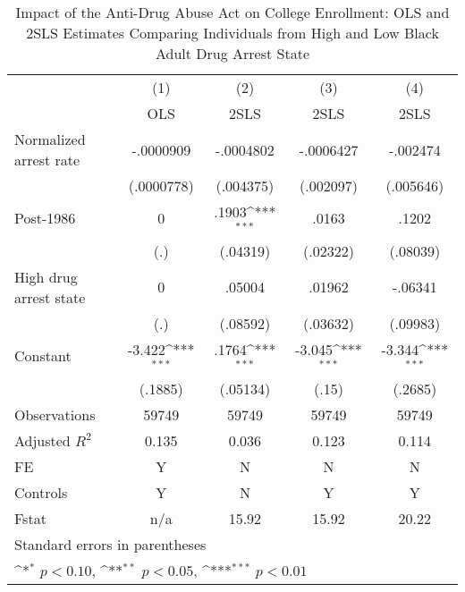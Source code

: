 \begin{table}[htbp]\centering
\def\sym#1{\ifmmode^{#1}\else\(^{#1}\)\fi}
\caption{Impact of the Anti-Drug Abuse Act on College Enrollment: OLS and 2SLS Estimates Comparing Individuals from High and Low Black Adult Drug Arrest State}
\begin{tabular}{l*{4}{c}}
\hline\hline
                    &\multicolumn{1}{c}{(1)}&\multicolumn{1}{c}{(2)}&\multicolumn{1}{c}{(3)}&\multicolumn{1}{c}{(4)}\\
                    &\multicolumn{1}{c}{OLS}&\multicolumn{1}{c}{2SLS}&\multicolumn{1}{c}{2SLS}&\multicolumn{1}{c}{2SLS}\\
\hline
Normalized arrest rate&   -.0000909         &   -.0004802         &   -.0006427         &    -.002474         \\
                    &  (.0000778)         &   (.004375)         &   (.002097)         &   (.005646)         \\
[1em]
Post-1986           &           0         &       .1903\sym{***}&       .0163         &       .1202         \\
                    &         (.)         &    (.04319)         &    (.02322)         &    (.08039)         \\
[1em]
High drug arrest state&           0         &      .05004         &      .01962         &     -.06341         \\
                    &         (.)         &    (.08592)         &    (.03632)         &    (.09983)         \\
[1em]
Constant            &      -3.422\sym{***}&       .1764\sym{***}&      -3.045\sym{***}&      -3.344\sym{***}\\
                    &     (.1885)         &    (.05134)         &       (.15)         &     (.2685)         \\
\hline
Observations        &       59749         &       59749         &       59749         &       59749         \\
Adjusted \(R^{2}\)  &       0.135         &       0.036         &       0.123         &       0.114         \\
FE                  &           Y         &           N         &           N         &           N         \\
Controls            &           Y         &           N         &           Y         &           Y         \\
Fstat               &         n/a         &       15.92         &       15.92         &       20.22         \\
\hline\hline
\multicolumn{5}{l}{\footnotesize Standard errors in parentheses}\\
\multicolumn{5}{l}{\footnotesize \sym{*} \(p<0.10\), \sym{**} \(p<0.05\), \sym{***} \(p<0.01\)}\\
\end{tabular}
\end{table}
